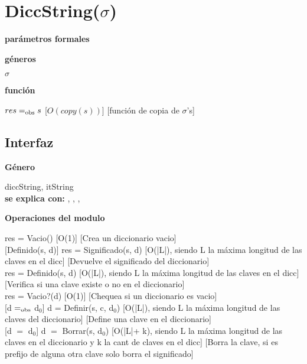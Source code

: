 \section{DiccString($\sigma$)}

\textbf{parámetros formales}\parindent\\
\parbox{1.7cm}{\textbf{géneros}}  $\sigma$\\
\parbox[t]{1.7cm}{\textbf{función}}\parbox[t]{\textwidth-2\parindent-1.7cm}{%
{$res =_{\mathrm{obs}} s$}
[$O(copy(s))$]
[función de copia de $\sigma$'s]
}

\subsection{Interfaz}

\parbox {1,7cm}{{\bf Género}} diccString, itString\\
{\bf se explica con:}  , , , \\
\medskip

\bf{Operaciones del modulo}

{res = Vacio()}
[O(1)]
[Crea un diccionario vacio]\\

[Definido(s, d)]
{res = Significado(s, d)}
[O(|L|), siendo L la máxima longitud de las claves en el dicc]
[Devuelve el significado del diccionario]\\

{res = Definido(s, d)}
[O(|L|), siendo L la máxima longitud de las claves en el dicc]
[Verifica si una clave existe o no en el diccionario]\\

{res = Vacio?(d)}
[O(1)]
[Chequea si un diccionario es vacio]\\

[d $=_{\mathrm{obs}}$ d$_0$]
{d = Definir(s, c, d$_0$)}
[O(|L|), siendo L la máxima longitud de las claves del diccionario]
[Define una clave en el diccionario]\\

[d $=$ d$_0$]
{d $=$ Borrar(s, d$_0$)}
[O(|L|+ k), siendo L la máxima longitud de las claves en el diccionario y k la cant de claves en el dicc]
[Borra la clave, si es prefijo de alguna otra clave solo borra el significado]\\

